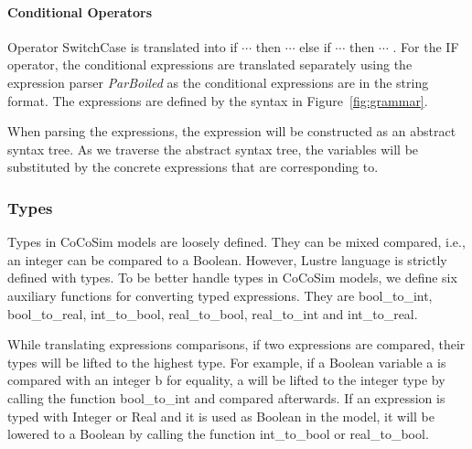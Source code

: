 \documentclass{article}
\begin{document}
\paragraph{Conditional Operators}
Operator SwitchCase is translated into \textsf{if $\cdots$ then $\cdots$ else if $\cdots$ then $\cdots$ }. 
For the IF operator, the conditional expressions are translated separately using the
expression parser \emph{ParBoiled} as the conditional expressions are in the string format. 
The expressions are defined by the syntax in Figure~\ref{fig:grammar}.

When parsing the expressions, the expression will be constructed as an abstract syntax tree. 
As we traverse the abstract syntax tree, the variables will be substituted by the concrete expressions
that are corresponding to.

\subsubsection{Types}

Types in CoCoSim models are loosely defined. 
They can be mixed compared, i.e., an integer can be compared to a Boolean.
However, Lustre language is strictly defined with types.
To be better handle types in CoCoSim models, we define six auxiliary functions
for converting typed expressions.
They are \textsf{bool\_to\_int, bool\_to\_real, int\_to\_bool, 
real\_to\_bool, real\_to\_int} and \textsf{int\_to\_real}. 

While translating expressions comparisons, if two expressions are compared, 
their types will be lifted to the highest type. For example, if a Boolean variable \textsf{a} 
is compared with an integer \textsf{b} for equality, \textsf{a} will be lifted to the integer 
type by calling the function \textsf{bool\_to\_int} and compared afterwards. 
If an expression is typed with Integer or Real and it is used as Boolean in the model,  it will be lowered 
to a Boolean by calling the function \textsf{int\_to\_bool} or \textsf{real\_to\_bool}.
 
\end{document}
